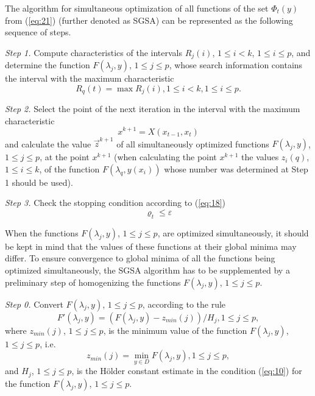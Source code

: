 \documentclass[runningheads]{llncs}
\begin{document}
The algorithm for simultaneous optimization of all functions of the set $\Phi_t(y)$ from (\ref{eq:21}) (further denoted as SGSA) can be represented as the following sequence of steps.

\textit{Step 1.} Compute characteristics of the intervals $R_j (i)$, $1 \leq i < k$, $1 \leq i \leq p$, and determine the function $F(\lambda_j,y)$, $1 \leq j \leq p$, whose search information contains the interval with the maximum characteristic
\begin{equation}
\label{eq:30}
R_q (t)=\max R_j (i), 1 \leq i < k, 1 \leq i \leq p.
\end{equation}

\textit{Step 2.} Select the point of the next iteration in the interval with the maximum characteristic
\begin{equation}
\label{eq:31}
x^{k+1}=X(x_{t-1},x_t )
\end{equation}
and calculate the value $\overrightarrow{z}^{k+1}$ of all simultaneously optimized functions $F(\lambda_j,y)$, $1 \leq j \leq p$, at the point $x^{k+1}$ (when calculating the point  $x^{k+1}$ the values $z_i (q)$, $1 \leq i \leq k$, of the function $F(\lambda_q,y(x_i))$ whose number was determined at Step 1 should be used).

\textit{Step 3.} Check the stopping condition according to (\ref{eq:18})
\begin{equation}
\label{eq:32}
\varrho_t \leq \varepsilon
\end{equation}

When the functions $F(\lambda_j,y)$, $1 \leq j \leq p$, are optimized simultaneously, it should be kept in mind that the values of these functions at their global minima may differ.  To ensure convergence to global minima of all the functions being optimized simultaneously, the SGSA algorithm has to be supplemented by a preliminary step of homogenizing the functions $F(\lambda_j,y)$, $1 \leq j \leq p$.

\textit{Step 0.} Convert $F(\lambda_j,y)$, $1 \leq j \leq p$, according to the rule
\begin{equation}
\label{eq:33}
F'(\lambda_j,y)=(F(\lambda_j,y)-z_{min} (j))/H_j, 1 \leq j \leq p,
\end{equation}
where $z_{min}(j)$, $1 \leq j \leq p$, is the minimum value of the function $F(\lambda_j,y)$, $1 \leq j \leq p$, i.e. 
\begin{equation}
\label{eq:34_2}
z_{min} (j)=\min_{y\in D}F(\lambda_j,y), 1 \leq j \leq p,
\end{equation}
and $H_j$, $1 \leq j \leq p$, is the H{\"o}lder constant estimate in the condition (\ref{eq:10}) for the function $F(\lambda_j,y)$, $1 \leq j \leq p$.
\end{document}
